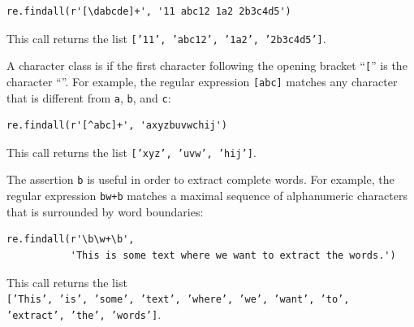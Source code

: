 \begin{verbatim}
re.findall(r'[\dabcde]+', '11 abc12 1a2 2b3c4d5')
\end{verbatim}

\noindent
This call returns the list \texttt{['11', 'abc12', '1a2', '2b3c4d5']}.

A character class is  if the first character following the opening bracket ``\texttt{[}'' is the
character ``\texttt{}''.  For example, the regular expression \texttt{[abc]} matches any
character that is different from \texttt{a}, \texttt{b}, and \texttt{c}:

\begin{verbatim}
re.findall(r'[^abc]+', 'axyzbuvwchij')
\end{verbatim}

\noindent
This call returns the list \texttt{['xyz', 'uvw', 'hij']}.

The assertion \texttt{b} is useful in order to extract complete words.  For example, the
regular expression \texttt{bw+b} matches a maximal sequence of alphanumeric
characters that is surrounded by word boundaries:

\begin{verbatim}
re.findall(r'\b\w+\b',
           'This is some text where we want to extract the words.')
\end{verbatim}

\noindent
This call returns the list
\\[0.2cm]
\hspace*{1.3cm}
\texttt{['This', 'is', 'some', 'text', 'where', 'we', 'want', 'to',} \\
\hspace*{1.5cm}
\texttt{'extract', 'the', 'words']}.


